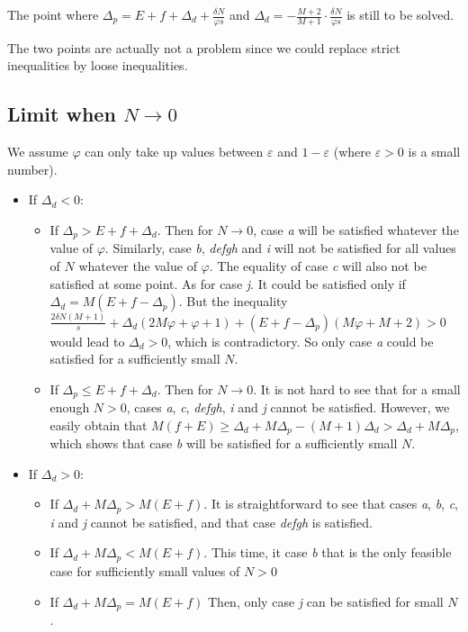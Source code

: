 \documentclass[english, a4paper]{article}
\theoremstyle{plain}
\theoremstyle{definition}
\theoremstyle{remark}
\begin{document}
    The point where $\Delta_p = E + f+ \Delta_d + \frac{\delta N}{\varphi s}$ and $\Delta_d = -\frac{M+2}{M+1}\cdot\frac{\delta N}{\varphi s}$ is still to be solved.

    The two points are actually not a problem since we could replace strict inequalities by loose inequalities.

    \subsection{Limit when $N \rightarrow 0$}

    We assume $\varphi$ can only take up values between $\varepsilon$ and $1 - \varepsilon$ (where $\varepsilon > 0$ is a small number).

    \begin{itemize}
        \item If $\Delta_d < 0$: \begin{itemize}
            \item If $\Delta_p > E + f + \Delta_d$. Then for $N\rightarrow 0$, case \emph{a} will be satisfied whatever the value of $\varphi$. Similarly, case \emph{b}, \emph{defgh} and \emph{i} will not be satisfied for all values of $N$ whatever the value of $\varphi$. The equality of case \emph{c} will also not be satisfied at some point. As for case \emph{j}. It could be satisfied only if $\Delta_d = M(E + f - \Delta_p)$. But the inequality $\frac{2\delta N(M+1)}{s} + \Delta_d(2M\varphi + \varphi + 1) + (E + f - \Delta_p)(M\varphi + M + 2) > 0$ would lead to $\Delta_d > 0$, which is contradictory. So only case \emph{a} could be satisfied for a sufficiently small $N$.

            \item If $\Delta_p \leq E + f + \Delta_d$. Then for $N\rightarrow 0$. It is not hard to see that for a small enough $N > 0$, cases \emph{a}, \emph{c}, \emph{defgh}, \emph{i} and \emph{j} cannot be satisfied. However, we easily obtain that $M(f + E) \geq \Delta_d + M\Delta_p - (M+1)\Delta_d > \Delta_d + M\Delta_p$, which shows that case \emph{b} will be satisfied for a sufficiently small $N$.
        \end{itemize}

        \item If $\Delta_d > 0$: \begin{itemize}
            \item If $\Delta_d + M\Delta_p > M(E+f)$. It is straightforward to see that cases \emph{a}, \emph{b}, \emph{c}, \emph{i} and \emph{j} cannot be satisfied, and that case \emph{defgh} is satisfied.
            \item If $\Delta_d + M\Delta_p < M(E+f)$. This time, it case \emph{b} that is the only feasible case for sufficiently small values of $N>0$
            \item If $\Delta_d + M\Delta_p = M(E+f)$ Then, only case \emph{j} can be satisfied for small $N$.
        \end{itemize}


\end{itemize}
\end{document}

